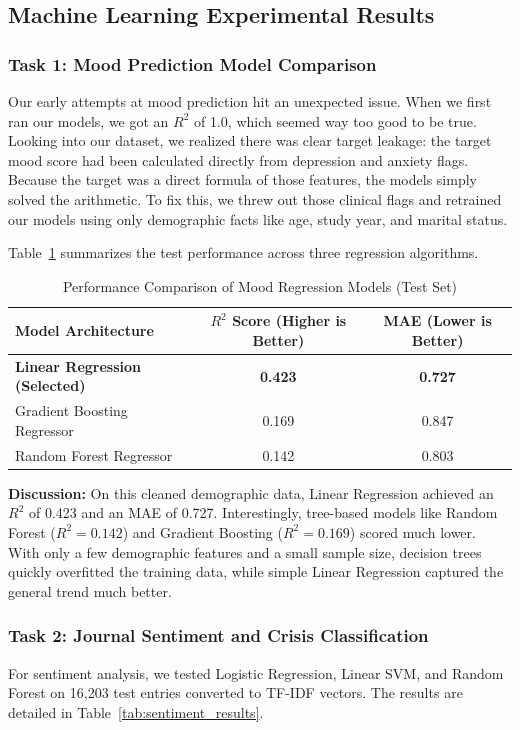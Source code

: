 \documentclass[a4paper,11pt]{report}
\begin{document}
\subsection{Machine Learning Experimental Results}

\subsubsection{Task 1: Mood Prediction Model Comparison}
Our early attempts at mood prediction hit an unexpected issue. When we first ran our models, we got an $R^2$ of 1.0, which seemed way too good to be true. Looking into our dataset, we realized there was clear target leakage: the target mood score had been calculated directly from depression and anxiety flags. Because the target was a direct formula of those features, the models simply solved the arithmetic. To fix this, we threw out those clinical flags and retrained our models using only demographic facts like age, study year, and marital status.

Table~\ref{tab:mood_results} summarizes the test performance across three regression algorithms.

\begin{table}[H]
\centering
\caption{Performance Comparison of Mood Regression Models (Test Set)}
\label{tab:mood_results}
\begin{tabular}{lcc}
\toprule
\textbf{Model Architecture} & \textbf{$R^2$ Score (Higher is Better)} & \textbf{MAE (Lower is Better)} \\
\midrule
\textbf{Linear Regression (Selected)} & \textbf{0.423} & \textbf{0.727} \\
Gradient Boosting Regressor           & 0.169          & 0.847          \\
Random Forest Regressor               & 0.142          & 0.803          \\
\bottomrule
\end{tabular}
\end{table}

\noindent \textbf{Discussion:} On this cleaned demographic data, Linear Regression achieved an $R^2$ of 0.423 and an MAE of 0.727. Interestingly, tree-based models like Random Forest ($R^2 = 0.142$) and Gradient Boosting ($R^2 = 0.169$) scored much lower. With only a few demographic features and a small sample size, decision trees quickly overfitted the training data, while simple Linear Regression captured the general trend much better.

\subsubsection{Task 2: Journal Sentiment and Crisis Classification}
For sentiment analysis, we tested Logistic Regression, Linear SVM, and Random Forest on 16,203 test entries converted to TF-IDF vectors. The results are detailed in Table~\ref{tab:sentiment_results}.
\end{document}
